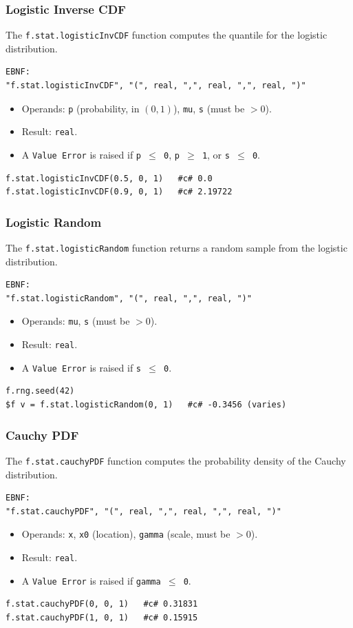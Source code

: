 \subsubsection{Logistic Inverse CDF}
The \texttt{f.stat.logisticInvCDF} function computes the quantile for the logistic distribution.
\begin{verbatim}
EBNF:
"f.stat.logisticInvCDF", "(", real, ",", real, ",", real, ")"
\end{verbatim}
\begin{itemize}
\item Operands: \texttt{p} (probability, in $(0, 1)$), \texttt{mu}, \texttt{s} (must be $> 0$).
\item Result: \texttt{real}.
\item A \texttt{Value Error} is raised if \texttt{p $\leq$ 0}, \texttt{p $\geq$ 1}, or \texttt{s $\leq$ 0}.
\end{itemize}
\begin{verbatim}
f.stat.logisticInvCDF(0.5, 0, 1)   #c# 0.0
f.stat.logisticInvCDF(0.9, 0, 1)   #c# 2.19722
\end{verbatim}

\subsubsection{Logistic Random}
The \texttt{f.stat.logisticRandom} function returns a random sample from the logistic distribution.
\begin{verbatim}
EBNF:
"f.stat.logisticRandom", "(", real, ",", real, ")"
\end{verbatim}
\begin{itemize}
\item Operands: \texttt{mu}, \texttt{s} (must be $> 0$).
\item Result: \texttt{real}.
\item A \texttt{Value Error} is raised if \texttt{s $\leq$ 0}.
\end{itemize}
\begin{verbatim}
f.rng.seed(42)
$f v = f.stat.logisticRandom(0, 1)   #c# -0.3456 (varies)
\end{verbatim}

\subsubsection{Cauchy PDF}
The \texttt{f.stat.cauchyPDF} function computes the probability density of the Cauchy distribution.
\begin{verbatim}
EBNF:
"f.stat.cauchyPDF", "(", real, ",", real, ",", real, ")"
\end{verbatim}
\begin{itemize}
\item Operands: \texttt{x}, \texttt{x0} (location), \texttt{gamma} (scale, must be $> 0$).
\item Result: \texttt{real}.
\item A \texttt{Value Error} is raised if \texttt{gamma $\leq$ 0}.
\end{itemize}
\begin{verbatim}
f.stat.cauchyPDF(0, 0, 1)   #c# 0.31831
f.stat.cauchyPDF(1, 0, 1)   #c# 0.15915
\end{verbatim}

